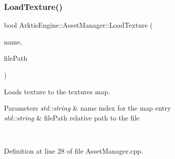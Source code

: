 \begin{DoxyCode}{0}

\end{DoxyCode}
\mbox{\label{class_arktis_engine_1_1_asset_manager_a69101c1f6e84b7e1f6e71a1fc8ae1543}} 
\subsubsection{\texorpdfstring{LoadTexture()}{LoadTexture()}}
{\footnotesize\ttfamily bool Arktis\+Engine\+::\+Asset\+Manager\+::\+Load\+Texture (\begin{DoxyParamCaption}\item[{std\+::string}]{name,  }\item[{std\+::string}]{file\+Path }\end{DoxyParamCaption})}



Loads texture to the textures map. 


\begin{DoxyParams}{Parameters}
{\em std\+::string} & name index for the map entry\\
\hline
{\em std\+::string} & file\+Path relative path to the file \begin{DoxyVerb}\end{DoxyVerb}
 \\
\hline
\end{DoxyParams}


Definition at line 28 of file Asset\+Manager.\+cpp.



